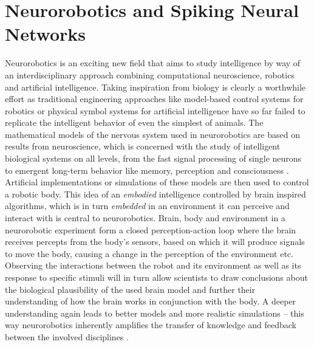 \section{Neurorobotics and Spiking Neural Networks}\label{sec:snn}
Neurorobotics is an exciting new field that aims to study intelligence by way of an interdisciplinary approach combining computational neuroscience, robotics and artificial intelligence. Taking inspiration from biology is clearly a worthwhile effort as traditional engineering approaches like model-based control systems for robotics or physical symbol systems for artificial intelligence have so far failed to replicate the intelligent behavior of even the simplest of animals. The mathematical models of the nervous system used in neurorobotics are based on results from neuroscience, which is concerned with the study of intelligent biological systems on all levels, from the fast signal processing of single neurons to emergent long-term behavior like memory, perception and consciousness \cite{BLOOM20133,BELL2013947,MANNS20131029, KOCH20131091, BYRNE20131009}. Artificial implementations or simulations of these models are then used to control a robotic body. This idea of an \emph{embodied} intelligence controlled by brain inspired algorithms, which is in turn \emph{embedded} in an environment it can perceive and interact with is central to neurorobotics. Brain, body and environment in a neurorobotic experiment form a closed perception-action loop where the brain receives percepts from the body's sensors, based on which it will produce signals to move the body, causing a change in the perception of the environment etc. Observing the interactions between the robot and its environment as well as its response to specific stimuli will in turn allow scientists to draw conclusions about the biological plausibility of the used brain model and further their understanding of how the brain works in conjunction with the body. A deeper understanding again leads to better models and more realistic simulations -- this way neurorobotics inherently amplifies the transfer of knowledge and feedback between the involved disciplines \cite{knoll2016neurorobotics}.

